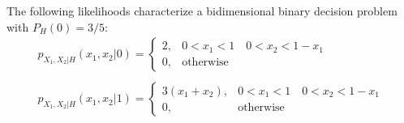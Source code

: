 \begin{solution}
\end{solution}

\else

\question The following likelihoods characterize a bidimensional binary decision problem with $P_H(0)=3/5$:
$$	\begin{array}{l}
					  p_{X_1,X_2|H}(x_1,x_2|0) = \left\lbrace   \begin{array}{ll} 
					  2, & 0<x_1<1 \quad 0<x_2<1-x_1 \\
					  0, & \mbox{otherwise}					  
					   \end{array}\right.  \\ 
					   \; \\
					  p_{X_1,X_2|H}(x_1,x_2|1) = \left\lbrace   \begin{array}{ll} 
					  3\left( x_1+x_2\right) , & 0<x_1<1 \quad 0<x_2<1-x_1 \\
					  0, & \mbox{otherwise}					  
					   \end{array}\right.  			
					  \end{array}	  $$
 
